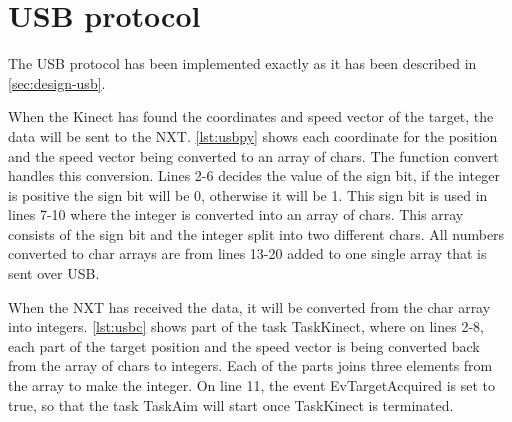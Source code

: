 \section{USB protocol}
The USB protocol has been implemented exactly as it has been described in \autoref{sec:design-usb}.

When the Kinect has found the coordinates and speed vector of the target, the data will be sent to the NXT. \autoref{lst:usbpy} shows each coordinate for the position and the speed vector being converted to an array of chars. The function convert handles this conversion. Lines 2-6 decides the value of the sign bit, if the integer is positive the sign bit will be 0, otherwise it will be 1. This sign bit is used in lines 7-10 where the integer is converted into an array of chars. This array consists of the sign bit and the integer split into two different chars.
All numbers converted to char arrays are from lines 13-20 added to one single array that is sent over USB.



When the NXT has received the data, it will be converted from the char array into integers. \autoref{lst:usbc} shows part of the task TaskKinect, where on lines 2-8, each part of the target position and the speed vector is being converted back from the array of chars to integers. Each of the parts joins three elements from the array to make the integer. 
On line 11, the event EvTargetAcquired is set to true, so that the task TaskAim will start once TaskKinect is terminated.

